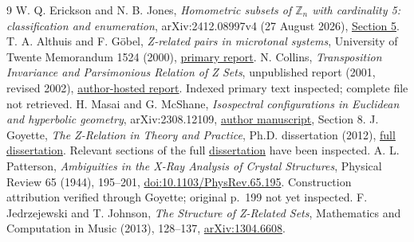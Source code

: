 \documentclass[11pt]{article}
\newcommand{\Z}{\mathbb Z}
\begin{document}
\begin{thebibliography}{9}
 W. Q. Erickson and N. B. Jones, \emph{Homometric subsets of $\Z_n$ with cardinality 5: classification and enumeration}, arXiv:2412.08997v4 (27 August 2026), \href{https://arxiv.org/html/2412.08997v4#S5}{Section 5}.
 T. A. Althuis and F. G\"obel, \emph{Z-related pairs in microtonal systems}, University of Twente Memorandum 1524 (2000), \href{https://ris.utwente.nl/ws/portalfiles/portal/5115044/1524.pdf}{primary report}.
 N. Collins, \emph{Transposition Invariance and Parsimonious Relation of Z Sets}, unpublished report (2001, revised 2002), \href{https://composerprogrammer.com/research/selftransposingz.pdf}{author-hosted report}. Indexed primary text inspected; complete file not retrieved.
 H. Masai and G. McShane, \emph{Isospectral configurations in Euclidean and hyperbolic geometry}, arXiv:2308.12109, \href{https://macbuse.github.io/MC0726.pdf}{author manuscript}, Section 8.
 J. Goyette, \emph{The Z-Relation in Theory and Practice}, Ph.D. dissertation (2012), \href{https://urresearch.rochester.edu/fileDownloadForInstitutionalItem.action?itemFileId=76476&itemId=24908}{full dissertation}. Relevant sections of the full \href{https://urresearch.rochester.edu/fileDownloadForInstitutionalItem.action?itemFileId=76476\&itemId=24908}{dissertation} have been inspected.
 A. L. Patterson, \emph{Ambiguities in the X-Ray Analysis of Crystal Structures}, Physical Review 65 (1944), 195--201, \href{https://doi.org/10.1103/PhysRev.65.195}{doi:10.1103/PhysRev.65.195}. Construction attribution verified through Goyette; original p.~199 not yet inspected.
 F. Jedrzejewski and T. Johnson, \emph{The Structure of Z-Related Sets}, Mathematics and Computation in Music (2013), 128--137, \href{https://arxiv.org/abs/1304.6608}{arXiv:1304.6608}.
\end{thebibliography}
\end{document}
